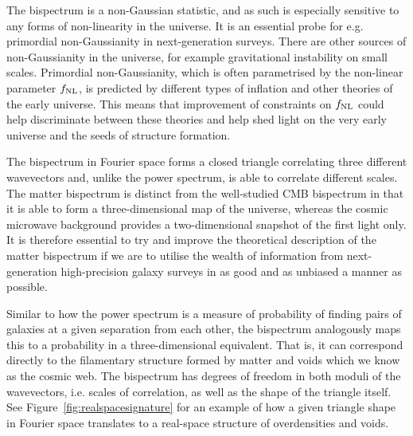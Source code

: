 The bispectrum is a non-Gaussian statistic, and as such is especially sensitive to any forms of non-linearity in the universe. It is an essential probe for e.g. primordial non-Gaussianity in next-generation surveys. There are other sources of non-Gaussianity in the universe, for example gravitational instability on small scales. Primordial non-Gaussianity, which is often parametrised by the non-linear parameter $f_\text{NL}$, is predicted by different types of inflation and other theories of the early universe. This means that improvement of constraints on $f_\text{NL}$ could help discriminate between these theories and help shed light on the very early universe and the seeds of structure formation. 

The bispectrum in Fourier space forms a closed triangle correlating three different wavevectors and, unlike the power spectrum, is able to correlate different scales. The matter bispectrum is distinct from the well-studied CMB bispectrum in that it is able to form a three-dimensional map of the universe, whereas the cosmic microwave background provides a two-dimensional snapshot of the first light only. It is therefore essential to try and improve the theoretical description of the matter bispectrum if we are to utilise the wealth of information from next-generation high-precision galaxy surveys in as good and as unbiased a manner as possible. 

Similar to how the power spectrum is a measure of probability of finding pairs of galaxies at a given separation from each other, the bispectrum analogously maps this to a probability in a three-dimensional equivalent. That is, it can correspond directly to the filamentary structure formed by matter and voids which we know as the cosmic web. The bispectrum has degrees of freedom in both moduli of the wavevectors, i.e. scales of correlation, as well as the shape of the triangle itself. See Figure~\ref{fig:realspacesignature} for an example of how a given triangle shape in Fourier space translates to a real-space structure of overdensities and voids. 

